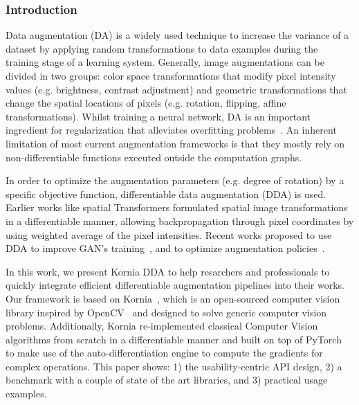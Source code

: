 \subsubsection{Introduction}
Data augmentation (DA) is a widely used technique to increase the variance of a dataset by applying random transformations to data examples during the training stage of a learning system. Generally, image augmentations can be divided in two groups: color space transformations that modify pixel intensity values (e.g. brightness, contrast adjustment) and geometric transformations that change the spatial locations of pixels  (e.g. rotation, flipping, affine transformations). Whilst training a neural network, DA is an important ingredient for regularization that alleviates overfitting problems~\cite{deeplearningbook2016}. An inherent limitation of most current augmentation frameworks is that they mostly rely on non-differentiable functions executed outside the computation graphs.

In order to optimize the augmentation parameters (e.g. degree of rotation) by a specific objective function, differentiable data augmentation (DDA) is used. Earlier works like spatial Transformers \cite{SpatialTransformers2015} formulated spatial image transformations in a differentiable manner, allowing backpropagation through pixel coordinates by using weighted average of the pixel intensities. Recent works proposed to use DDA to improve GAN's training~\citep{zhao2020differentiable}, and to optimize augmentation policies~\citep{hataya2020meta, hataya2019faster}.
 
In this work, we present Kornia DDA to help resarchers and professionals to quickly integrate efficient differentiable augmentation pipelines into their works. Our framework is based on Kornia~\citep{eriba2019kornia, eriba2020kornia}, which is an open-sourced computer vision library inspired by OpenCV~\citep{opencv} and designed to solve generic computer vision problems. Additionally, Kornia re-implemented classical Computer Vision algorithms from scratch in a differentiable manner and built on top of PyTorch~\citep{paszke2017automatic} to make use of the auto-differentiation engine to compute the gradients for complex operations. This paper shows: 1) the usability-centric API design, 2) a benchmark with a couple of state of the art libraries, and 3) practical usage examples.

